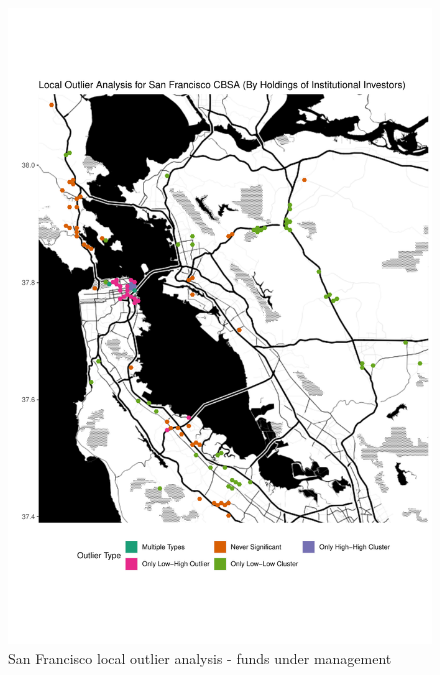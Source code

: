 \begin{figure}
	\centering
	\includegraphics[width=1\linewidth]{Figures/ChapterIV/SF_Money_LO}
	\caption[San Francisco CBSA Local Outlier Analysis - Funds Under Management 2013-2018]{San Francisco local outlier analysis - funds under management}
	\label{fig:SFlocaloutlier}
\end{figure}

